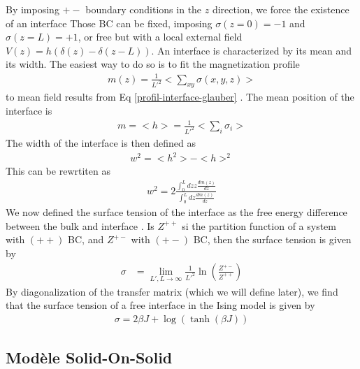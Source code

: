 {\color{purple}
By imposing $+-$ boundary conditions in the $z$ direction, we force the existence of an interface Those BC can be fixed, imposing  $\sigma(z=0) = -1$ and $\sigma(z=L)=+1$, or free but with a local external field $V(z) = h (\delta(z)-\delta(z-L))$.
An interface is characterized by its mean and its width. The easiest way to do so is to fit the magnetization profile
\begin{align}
    m(z) = \frac{1}{L'^2} < \sum_{xy} \sigma(x,y,z) >
\end{align}
to mean field results from Eq \eqref{profil-interface-glauber} \cite{stecki_magnetization_1994}. The mean position of the interface is
\begin{align}
    m = <h> = \frac{1}{L'^2} < \sum_i \sigma_i >
\end{align}
The width of the interface is then defined as 
\begin{align}
    w^2 = <h^2>-<h>^2
\end{align}
This can be rewrtiten as
\begin{align}
    w^2 = 2 \frac{ \int_0^L dz z \frac{d m(z)}{dz}}{\int_0^L dz \frac{d m(z)}{dz}}
\end{align}
We now defined the surface tension of the interface as the free energy difference between  the bulk and interface \cite{abraham_interface_1976,richards_numerical_1993}. Is $Z^{++}$ si the partition function of a system with $(++)$ BC, and $Z^{+-}$ with $(+-)$ BC, then the surface tension is given by
\begin{align}
    \sigma &= \lim_{L',L \to \infty} \frac{1}{L'^2} \ln \left( \frac{Z^{+-}}{Z^{++}} \right) 
\end{align}
By diagonalization of the transfer matrix (which we will define later), we find that the surface tension of a free interface in the Ising model \cite{abraham_transfer_1973} is given by
\begin{align}
    \sigma = 2 \beta J + \log(\tanh(\beta J))    
\end{align}
}
    \subsection{Modèle Solid-On-Solid}

